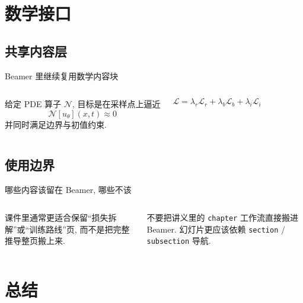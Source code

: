 \documentclass[aspectratio=169,fontpreset=common,theme=cobalt,layout=splitbar]{maki-beamer}
\begin{document}
\section{数学接口}
\subsection{共享内容层}

\begin{frame}[t]{Beamer 里继续复用数学内容块}
  \small
  \begin{columns}[T,onlytextwidth]
    \begin{definition}[残差最小化]
      给定 PDE 算子 \(\mathcal N\), 目标是在采样点上逼近
      \[
        \mathcal N[u_\theta](x,t) \approx 0
      \]
      并同时满足边界与初值约束.
    \end{definition}

    \begin{keyformula}[损失拆解]
      \[
        \mathcal L
        =
        \lambda_r \mathcal L_r
        +
        \lambda_b \mathcal L_b
        +
        \lambda_i \mathcal L_i
      \]
    \end{keyformula}

  \end{columns}
\end{frame}

\subsection{使用边界}

\begin{frame}[t]{哪些内容该留在 Beamer, 哪些不该}
  \small
  \begin{columns}[T,onlytextwidth]
    \begin{methodnote}
      课件里通常更适合保留“损失拆解”或“训练路线”页, 而不是把完整推导整页搬上来.
    \end{methodnote}

    \begin{pitfall}
      不要把讲义里的 \texttt{chapter} 工作流直接搬进 Beamer. 幻灯片更应该依赖 \texttt{section} / \texttt{subsection} 导航.
    \end{pitfall}
  \end{columns}
\end{frame}

\section{总结}
\end{document}
